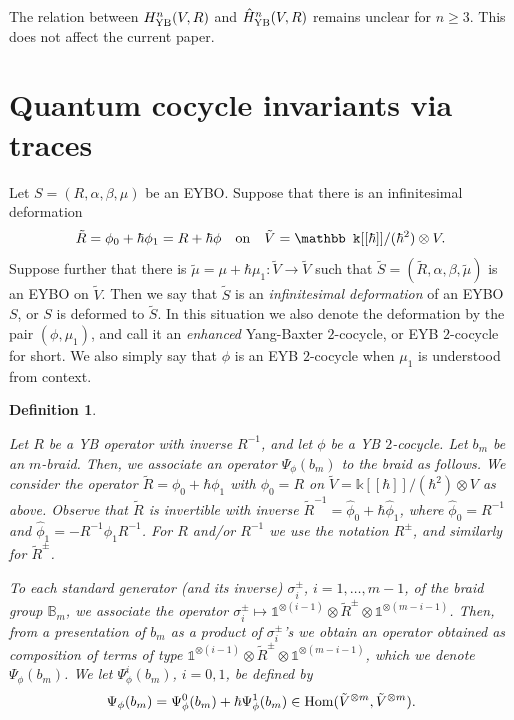 \documentclass[11pt,fleqn]{amsart} %
\newtheorem{definition}[theorem]{Definition}
\begin{document}
	The relation between $H^n_{\rm YB}(V,R)$ and $\hat H^n_{\rm YB}(V,R)$ remains unclear
	for $n\geq 3$. This does not affect the current paper.
		

\section{Quantum cocycle invariants  via traces}\label{sec:inf_def}



Let $S = (R, \alpha, \beta, \mu)$ be an EYBO. 
Suppose that there is an infinitesimal deformation 
$$\tilde R=\phi_0 + \hbar \phi_1=R + \hbar \phi
\quad {\rm on} \quad 
\tilde V={\mathbb k} [[ \hbar ]] / (\hbar^2 )  \otimes V . $$
Suppose further  that there is $\tilde \mu = \mu + \hbar \mu_1 : \tilde V \rightarrow \tilde V$ such that
$\tilde S = (\tilde R, \alpha, \beta, \tilde \mu ) $ is an EYBO on $\tilde V$.
Then we say that $\tilde S$ is  an {\it infinitesimal deformation} of an EYBO $S$, or $S$ is deformed to $\tilde S$.  In this situation we also denote the deformation by the pair $(\phi,\mu_1)$, 
and call it an {\it enhanced} Yang-Baxter $2$-cocycle, or EYB $2$-cocycle for short.
We also  simply say that $\phi$ is an EYB $2$-cocycle when $\mu_1$ is understood from context.

\begin{definition}\label{def:deg1_operator}
	{\rm 
			Let $R$ be a YB operator
			with inverse $R^{-1}$, 
			and let $\phi$ be a YB $2$-cocycle. 
			Let $b_m$ be an $m$-braid. Then, we associate an operator 
			$\Psi_\phi(b_m)$  
			 to the braid 
			 as follows. We consider the operator 
			$\tilde R = \phi_0 + \hbar \phi_1$ with $\phi_0=R$ 
			 on 
			 $\tilde V = {\mathbb k} [[ \hbar ]] / (\hbar^2 ) \otimes V$ 
			 	 as above. 
			Observe that $\tilde R$ is invertible with inverse $\tilde R^{-1} = \hat \phi_0 + \hbar \hat \phi_1 $, 
				 where $\hat \phi_0 = R^{-1}$ and $\hat \phi_1 = -R^{-1}\phi_1R^{-1}$. 
				For $R$ and/or $R^{-1}$ we use the notation $R^{\pm}$, and similarly for $\tilde R^{\pm}$.
				 
				 To each standard  generator (and  its inverse) $\sigma^{\pm}_i$, $i=1,\ldots, m-1$, of the braid group $\mathbb  B_m$,
			 we associate the operator $\sigma_i^{\pm}  \mapsto \mathbb 1^{\otimes ( i-1)}\otimes \tilde R^\pm \otimes \mathbb 1^{\otimes (m-i-1)}$. Then, from a presentation of $b_m$ as a product of $\sigma_i^{\pm}$'s we obtain an operator obtained as composition of terms of type $\mathbb 1^{\otimes (i-1)}\otimes \tilde R^\pm \otimes \mathbb 1^{\otimes (m-i-1)}$, which we denote 
			  $\Psi_\phi(b_m)$. 
			 We let $\Psi^i_\phi(b_m)$, $i=0,1$, be defined by 
			 $$
			 \Psi_\phi(b_m) = \Psi^0_\phi(b_m) + \hbar \Psi^1_\phi(b_m) \in 
			 {\rm Hom}(\tilde{V}^{\otimes m},\tilde{V}^{\otimes m}).
			 $$
			
	}
\end{definition}
\end{document}

